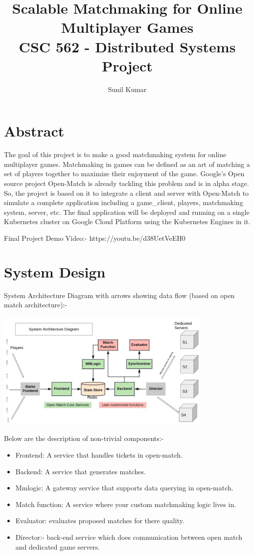 \documentclass[12pt, letter]{article}
\newcommand{\courseName}{Scalable Matchmaking for Online Multiplayer Games}
\newcommand{\assignName}{CSC 562 - Distributed Systems Project}
\begin{document}
\pagestyle{titlesec_assignment}

\title{\courseName\\\assignName}
\author{Sunil Kumar}
\maketitle

\section{Abstract}
The goal of this project is to make a good matchmaking system for online multiplayer games. Matchmaking in games can be defined as an art of matching a set of players together to maximize their enjoyment of the game. Google's Open source project Open-Match is already tackling this problem and is in alpha stage. So, the project is based on it to integrate a client and server with Open-Match to simulate a complete application including a game\_client, players, matchmaking system, server, etc. The final application will be deployed and running on a single Kubernetes cluster on Google Cloud Platform using the Kubernetes Engines in it. 

Final Project Demo Video:- https://youtu.be/d38UetVeEH0

\section{System Design}

System Architecture Diagram with arrows showing data flow (based on open match architecture):-

\centerline{
   \includegraphics[width=0.8\textwidth]{images/arch2.png}
}

Below are the description of non-trivial components:-
\begin{itemize}
  \item Frontend: A service that handles tickets in open-match.
  \item Backend: A service that generates matches.
  \item Mmlogic: A gateway service that supports data querying in open-match.
  \item Match function: A service where your custom matchmaking logic lives in.
  \item Evaluator: evaluates proposed matches for there quality.
  \item Director:- back-end service which does communication between open match and dedicated game servers.

\end{itemize}
\end{document}
